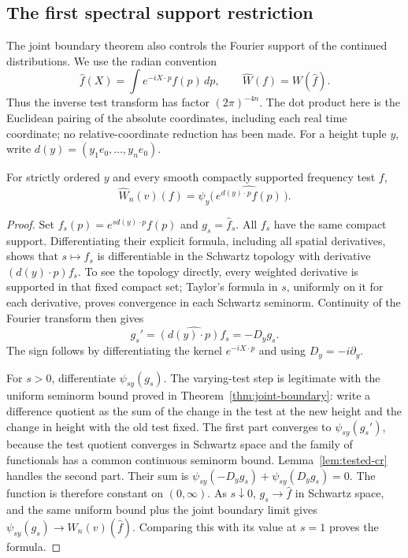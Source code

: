 \subsection{The first spectral support restriction}
\label{sec:fourier-support}
The joint boundary theorem also controls the Fourier support of the
continued distributions. We use the radian convention
\[
 \widehat f(X)=\int e^{-iX\cdot p}f(p)\,dp,\qquad
 \widehat W(f)=W(\widehat f).
\]
Thus the inverse test transform has factor $(2\pi)^{-4n}$. The dot product
here is the Euclidean pairing of the absolute coordinates, including each
real time coordinate; no relative-coordinate reduction has been made.
For a height tuple $y$, write $d(y)=(y_1e_0,\ldots,y_ne_0)$.

\begin{lemma}\label{lem:exponential-testing}
For strictly ordered $y$ and every smooth compactly supported frequency test
$f$,
\begin{equation}\label{eq:frequency-height}
 \widehat W_n(v)(f)
   =\psi_y\big(\widehat{\,e^{d(y)\cdot p}f(p)\,}\big).
\end{equation}
\end{lemma}
\begin{proof}
Set $f_s(p)=e^{s d(y)\cdot p}f(p)$ and $g_s=\widehat f_s$.
All $f_s$ have the same compact support. Differentiating their explicit
formula, including all spatial derivatives, shows that
$s\mapsto f_s$ is differentiable in the Schwartz topology with derivative
$(d(y)\cdot p)f_s$. To see the topology directly, every weighted derivative
is supported in that fixed compact set; Taylor's formula in $s$, uniformly
on it for each derivative, proves convergence in each Schwartz seminorm.
Continuity of the Fourier transform then gives
\[
 g_s'=\widehat{(d(y)\cdot p)f_s}=-D_yg_s.
\]
The sign follows by differentiating the kernel $e^{-iX\cdot p}$ and using
$D_y=-i\partial_y$.

For $s>0$, differentiate $\psi_{sy}(g_s)$. The varying-test step is
legitimate with the uniform seminorm bound proved in
Theorem~\ref{thm:joint-boundary}: write a difference quotient as the sum
of the change in the test at the new height and the change in height with
the old test fixed. The first part converges to $\psi_{sy}(g_s')$, because
the test quotient converges in Schwartz space and the family of functionals
has a common continuous seminorm bound. Lemma~\ref{lem:tested-cr} handles
the second part. Their sum is
$\psi_{sy}(-D_yg_s)+\psi_{sy}(D_yg_s)=0$.
The function is therefore constant on $(0,\infty)$. As $s\downarrow0$,
$g_s\to\widehat f$ in Schwartz space, and the same uniform bound plus the
joint boundary limit gives
$\psi_{sy}(g_s)\to W_n(v)(\widehat f)$. Comparing this with its value
at $s=1$ proves the formula.
\end{proof}

